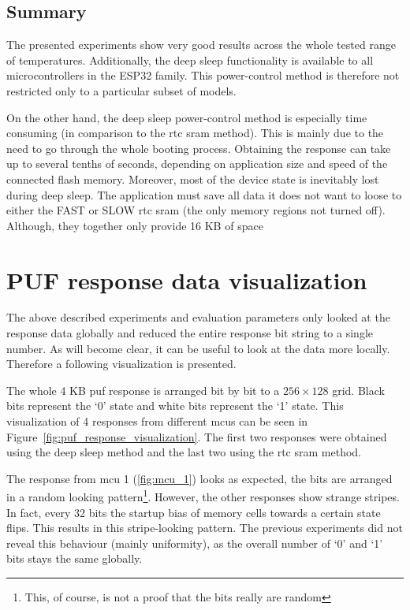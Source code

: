 \subsection{Summary}

The presented experiments show very good results across the whole tested range of temperatures. Additionally, the deep sleep functionality is available to all microcontrollers in the ESP32 family. This power-control method is therefore not restricted only to a particular subset of models.

On the other hand, the deep sleep power-control method is especially time consuming (in comparison to the \gls{rtc} \gls{sram} method). This is mainly due to the need to go through the whole booting process. Obtaining the response can take up to several tenths of seconds, depending on application size and speed of the connected flash memory. Moreover, most of the device state is inevitably lost during deep sleep. The application must save all data it does not want to loose to either the FAST or SLOW \gls{rtc} \gls{sram} (the only memory regions not turned off). Although, they together only provide 16 KB of space

\section{PUF response data visualization} %

The above described experiments and evaluation parameters only looked at the response data globally and reduced the entire response bit string to a single number. As will become clear, it can be useful to look at the data more locally. Therefore a following visualization is presented.

The whole 4 KB \gls{puf} response is arranged bit by bit to a $256 \times 128$ grid. Black bits represent the `0' state and white bits represent the `1' state. This visualization of 4 responses from different \glspl{mcu} can be seen in Figure~\ref{fig:puf_response_visualization}. The first two responses were obtained using the deep sleep method and the last two using the \gls{rtc} \gls{sram} method.

The response from \gls{mcu} 1 (\ref{fig:mcu_1}) looks as expected, the bits are arranged in a random looking pattern\footnote{This, of course, is not a proof that the bits really are random}. However, the other responses show strange stripes. In fact, every 32 bits the startup bias of memory cells towards a certain state flips. This results in this stripe-looking pattern. The previous experiments did not reveal this behaviour (mainly uniformity), as the overall number of  `0' and `1' bits stays the same globally.

